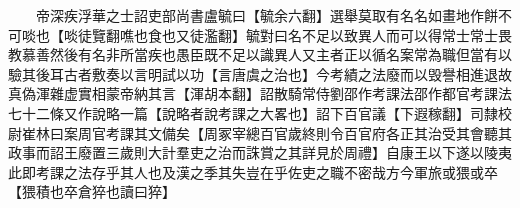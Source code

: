 　　帝深疾浮華之士詔吏部尚書盧毓曰【毓余六翻】選舉莫取有名名如畫地作餅不可啖也【啖徒覽翻噍也食也又徒濫翻】毓對曰名不足以致異人而可以得常士常士畏教慕善然後有名非所當疾也愚臣既不足以識異人又主者正以循名案常為職但當有以驗其後耳古者敷奏以言明試以功【言唐虞之治也】今考績之法廢而以毁譽相進退故真偽渾雜虚實相蒙帝納其言【渾胡本翻】詔散騎常侍劉邵作考課法邵作都官考課法七十二條又作說略一篇【說略者說考課之大畧也】詔下百官議【下遐稼翻】司隸校尉崔林曰案周官考課其文備矣【周冢宰總百官歲終則令百官府各正其治受其會聽其政事而詔王廢置三歲則大計羣吏之治而誅賞之其詳見於周禮】自康王以下遂以陵夷此即考課之法存乎其人也及漢之季其失豈在乎佐吏之職不密哉方今軍旅或猥或卒【猥積也卒倉猝也讀曰猝】